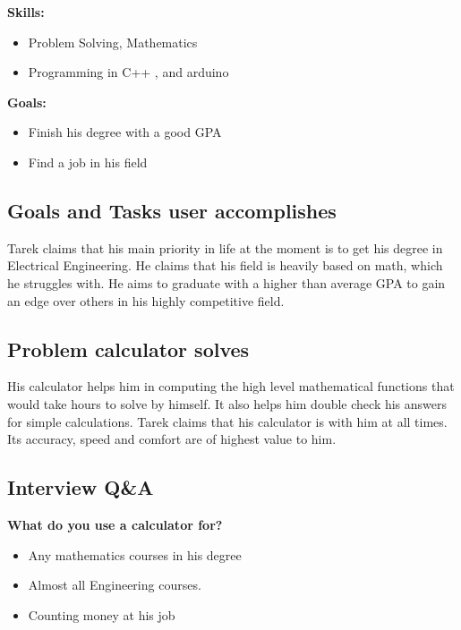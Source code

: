 \documentclass{article}
\begin{document}
\textbf{Skills:}
\begin{itemize}
\itemsep0em 
\item Problem Solving, Mathematics
\item Programming in C++ , and arduino 
\end{itemize}

\textbf{Goals:}
\begin{itemize}
\itemsep0em 
\item Finish his degree with a good GPA
\item Find a job in his field
\end{itemize}

\subsection*{Goals and Tasks user accomplishes}
Tarek claims that his main priority in life at the moment is to get his degree in Electrical Engineering. He claims that his field is heavily based on math, which he struggles with.
He aims to graduate with a higher than average GPA to gain an edge over others in his highly competitive field.

\subsection*{Problem calculator solves}
His calculator helps him in computing the high level mathematical functions that would take hours to solve by himself. It also helps him double check his answers for simple calculations.
Tarek claims that his calculator is with him at all times. Its accuracy, speed and comfort are of highest value to him.
\pagebreak

\subsection*{Interview Q\&A}
\textbf{What do you use a calculator for?}
\begin{itemize}
\itemsep0em 
\item Any mathematics courses in his degree
\item Almost all Engineering courses.
\item Counting money at his job 
\end{itemize}
\end{document}
